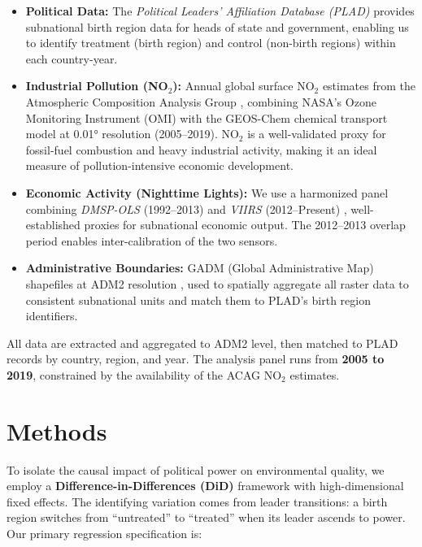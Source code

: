 \documentclass[12pt]{article}
\begin{document}
\begin{itemize}
    \item \textbf{Political Data:} The \textit{Political Leaders' Affiliation Database (PLAD)} \parencite{Bomprezzi2025PLAD} provides subnational birth region data for heads of state and government, enabling us to identify treatment (birth region) and control (non-birth regions) within each country-year.

    \item \textbf{Industrial Pollution (NO$_2$):} Annual global surface NO$_2$ estimates from the Atmospheric Composition Analysis Group \parencite{Cooper2022NO2}, combining NASA's Ozone Monitoring Instrument (OMI) with the GEOS-Chem chemical transport model at 0.01° resolution (2005--2019). NO$_2$ is a well-validated proxy for fossil-fuel combustion and heavy industrial activity, making it an ideal measure of pollution-intensive economic development.

    \item \textbf{Economic Activity (Nighttime Lights):} We use a harmonized panel combining \textit{DMSP-OLS} (1992--2013) and \textit{VIIRS} (2012--Present) \parencite{Elvidge2013VIIRS}, well-established proxies for subnational economic output. The 2012--2013 overlap period enables inter-calibration of the two sensors.

    \item \textbf{Administrative Boundaries:} GADM (Global Administrative Map) shapefiles at ADM2 resolution \parencite{GADM2022}, used to spatially aggregate all raster data to consistent subnational units and match them to PLAD's birth region identifiers.
\end{itemize}

All data are extracted and aggregated to ADM2 level, then matched to PLAD records by country, region, and year. The analysis panel runs from \textbf{2005 to 2019}, constrained by the availability of the ACAG NO$_2$ estimates.

\section*{Methods}

To isolate the causal impact of political power on environmental quality, we employ a \textbf{Difference-in-Differences (DiD)} framework with high-dimensional fixed effects. The identifying variation comes from leader transitions: a birth region switches from ``untreated'' to ``treated'' when its leader ascends to power. Our primary regression specification is:
\end{document}
